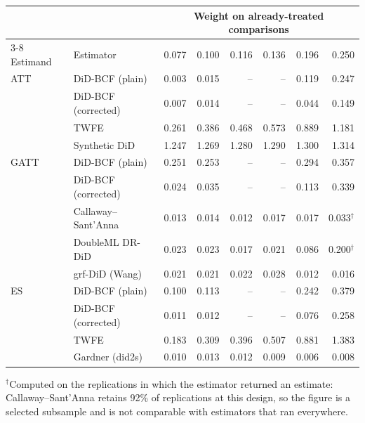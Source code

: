 \begin{tabular}{llrrrrrr}
\toprule
& & \multicolumn{6}{c}{Weight on already-treated comparisons} \\
\cmidrule(lr){3-8}
Estimand & Estimator & 0.077 & 0.100 & 0.116 & 0.136 & 0.196 & 0.250 \\
\midrule
ATT & DiD-BCF (plain) & 0.003 & 0.015 & -- & -- & 0.119 & 0.247 \\
 & DiD-BCF (corrected) & 0.007 & 0.014 & -- & -- & 0.044 & 0.149 \\
 & TWFE & 0.261 & 0.386 & 0.468 & 0.573 & 0.889 & 1.181 \\
 & Synthetic DiD & 1.247 & 1.269 & 1.280 & 1.290 & 1.300 & 1.314 \\
\midrule
GATT & DiD-BCF (plain) & 0.251 & 0.253 & -- & -- & 0.294 & 0.357 \\
 & DiD-BCF (corrected) & 0.024 & 0.035 & -- & -- & 0.113 & 0.339 \\
 & Callaway--Sant'Anna & 0.013 & 0.014 & 0.012 & 0.017 & 0.017 & 0.033$^{\dagger}$ \\
 & DoubleML DR-DiD & 0.023 & 0.023 & 0.017 & 0.021 & 0.086 & 0.200$^{\dagger}$ \\
 & grf-DiD (Wang) & 0.021 & 0.021 & 0.022 & 0.028 & 0.012 & 0.016 \\
\midrule
ES & DiD-BCF (plain) & 0.100 & 0.113 & -- & -- & 0.242 & 0.379 \\
 & DiD-BCF (corrected) & 0.011 & 0.012 & -- & -- & 0.076 & 0.258 \\
 & TWFE & 0.183 & 0.309 & 0.396 & 0.507 & 0.881 & 1.383 \\
 & Gardner (did2s) & 0.010 & 0.013 & 0.012 & 0.009 & 0.006 & 0.008 \\
\bottomrule
\end{tabular}
\par\smallskip\footnotesize $^{\dagger}$Computed on the replications in which the estimator returned an estimate: Callaway--Sant'Anna retains 92\% of replications at this design, so the figure is a selected subsample and is not comparable with estimators that ran everywhere.
